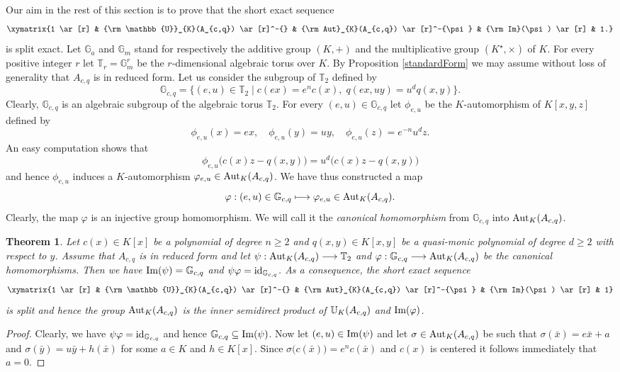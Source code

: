 \documentclass{article}
\newcommand \G {\mathbb{G}}
\newcommand \T {\mathbb{T}}
\renewcommand \a {A}
\renewcommand \k {K}
\newcommand \saut {{\rm \mathbb{U}}}
\newcommand \auto {{\rm Aut}}
\newcommand \image {{\rm Im}}
\newtheorem{theorem}{Theorem}
\begin{document}
{Our aim in the rest of this section is to prove that the short exact sequence $$\xymatrix{1 \ar[r] & \saut_{\k}(\a_{c,q}) \ar[r]^-{} & \auto_{\k}(\a_{c,q}) \ar[r]^-{\psi} & \image(\psi) \ar[r] & 1.}$$ is split exact. Let $\G_a$ and $\G_m$ stand for respectively the additive group $(\k,+)$ and the multiplicative group $(\k^{\star},\times)$ of $\k$.
For every positive integer $r$ let $\T_r=\G_m^r$ be the $r$-dimensional algebraic torus over $\k$. By Proposition \ref{standardForm} we may assume without loss of generality that $\a_{c,q}$ is in reduced form. Let us consider the subgroup of $\T_2$ defined by
$$\G_{c,q}=\Big\{(e,u)\in\T_2\mid c(ex)=e^nc(x),\; q(ex,uy)=u^dq(x,y) \Big\}.$$Clearly, $\G_{c,q}$ is an algebraic subgroup of the algebraic torus $\T_2$. For every $(e,u)\in\G_{c,q}$ let $\phi_{e,u}$ be the $\k$-automorphism of $\k[x,y,z]$ defined by $$\phi_{e,u}(x)=ex,\quad \phi_{e,u}(y)=uy,\quad \phi_{e,u}(z)=e^{-n}u^dz.$$ An easy computation shows that $$\phi_{e,u}\big(c(x)z-q(x,y)\big)=u^d\big(c(x)z-q(x,y)\big)$$ and hence $\phi_{e,u}$ induces a $\k$-automorphism $\varphi_{e,u}\in\auto_{\k}(\a_{c,q})$. We have thus constructed a map $$\varphi: (e,u)\in \G_{c,q}\longmapsto \varphi_{e,u}\in \auto_{\k}(\a_{c,q}).$$ Clearly, the map $\varphi$ is an injective group homomorphism. We will call it the {\it canonical homomorphism} from $\G_{c,q}$ into $ \auto_{\k}(\a_{c,q})$.

\begin{theorem}\label{splittingTheoremCentered}Let $c(x)\in\k[x]$ be a polynomial of degree $n\geq 2$ and $q(x,y)\in\k[x,y]$ be a quasi-monic polynomial of degree $d\geq 2$ with respect to $y$. Assume that $\a_{c,q}$ is in reduced form and let $\psi:\auto_{\k}(\a_{c,q})\longrightarrow \T_2$ and $\varphi:\G_{c,q}\longrightarrow\auto_{\k}(\a_{c,q})$ be the canonical homomorphisms. Then we have $\image(\psi)=\G_{c,q}$ and $\psi\varphi={\rm id}_{\G_{c,q}}$. As a consequence, the short exact sequence
	$$\xymatrix{1 \ar[r] & \saut_{\k}(\a_{c,q}) \ar[r]^-{} & \auto_{\k}(\a_{c,q}) \ar[r]^-{\psi} & \image(\psi) \ar[r] & 1}$$ is split and hence the group $\auto_{\k}(\a_{c,q})$ is the inner semidirect product of $\saut_{\k}(\a_{c,q})$ and $\image(\varphi)$.
\end{theorem}
\begin{proof}Clearly, we have $\psi\varphi={\rm id}_{\G_{c,q}}$ and hence $\G_{c,q}\subseteq \image(\psi)$. Now let $(e,u)\in\image(\psi)$ and let $\sigma\in\auto_{\k}(\a_{c,q})$ be such that $\sigma(\bar{x})=e\bar{x}+a$ and $\sigma(\bar{y})=u\bar{y}+h(\bar{x})$ for some $a\in\k$ and $h\in\k[x]$. Since $\sigma\big(c(\bar{x})\big)=e^nc(\bar{x})$ and $c(x)$ is centered it follows immediately that $a=0$.
	

\end{proof}}
\end{document}
